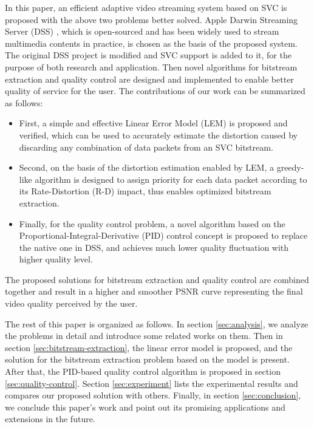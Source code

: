 \documentclass[journal]{IEEEtran}
\begin{document}
In this paper, an efficient adaptive video streaming system based on SVC is proposed with the above two problems better solved. Apple Darwin Streaming Server (DSS) \cite{DSS}, which is open-sourced and has been widely used to stream multimedia contents in practice, is chosen as the basis of the proposed system. The original DSS project is modified and SVC support is added to it, for the purpose of both research and application. Then novel algorithms for bitstream extraction and quality control are designed and implemented to enable better quality of service for the user. The contributions of our work can be summarized as follows:
\begin{itemize}
\item First, a simple and effective Linear Error Model (LEM) is proposed and verified, which can be used to accurately estimate the distortion caused by discarding any combination of data packets from an SVC bitstream.
\item Second, on the basis of the distortion estimation enabled by LEM, a greedy-like algorithm is designed to assign priority for each data packet according to its Rate-Distortion (R-D) impact, thus enables optimized bitstream extraction.
\item Finally, for the quality control problem, a novel algorithm based on the Proportional-Integral-Derivative (PID) control concept is proposed to replace the native one in DSS, and achieves much lower quality fluctuation with higher quality level.
\end{itemize}

The proposed solutions for bitstream extraction and quality control are combined together and result in a higher and smoother PSNR curve representing the final video quality perceived by the user.

The rest of this paper is organized as follows. In section \ref{sec:analysis}, we analyze the problems in detail and introduce some related works on them. Then in section \ref{sec:bitstream-extraction}, the linear error model is proposed, and the solution for the bitstream extraction problem based on the model is present. After that, the PID-based quality control algorithm is proposed in section \ref{sec:quality-control}. Section \ref{sec:experiment} lists the experimental results and compares our proposed solution with others. Finally, in section \ref{sec:conclusion}, we conclude this paper's work and point out its promising applications and extensions in the future.


\end{document}

